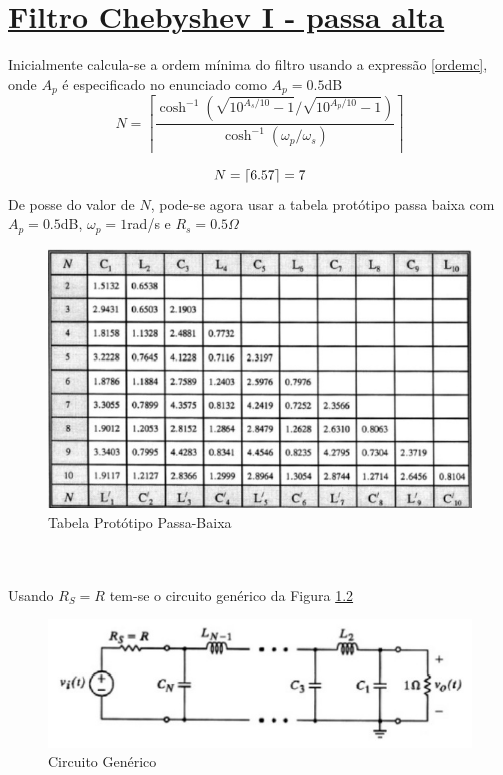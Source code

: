 \documentclass[14pt, oneside]{book}
\DeclarePairedDelimiter{\ceil}{\lceil}{\rceil}
\newcommand\tab[1][1cm]{\hspace*{#1}}
\theoremstyle{definition}
\begin{document}
             
            
        \chapter[Filtro Chebyshev I - passa alta]{\hyperlink{toc}{Filtro Chebyshev I - passa alta}}
            \tab Inicialmente calcula-se a ordem mínima do filtro usando a expressão \ref{ordemc}, onde $A_p$ é especificado no enunciado como $A_p =0.5$dB 
            \begin{equation}
            \label{ordemc}
            N = \left\lceil{\frac{\cosh^{-1}{(\sqrt{10^{A_s/10}-1}/\sqrt{10^{A_p/10}-1})}}{\cosh^{-1}{(\omega_p/\omega_s)}}}\right\rceil
            \end{equation}
            
            \begin{equation}
            \label{uhu}
            N = \ceil{6.57} = 7
            \end{equation}
            \tab De posse do valor de $N$, pode-se agora usar a tabela protótipo passa baixa com $A_p=0.5$dB, $\omega_p =1$rad/s e $R_s =0.5\Omega$\\
            \begin{figure}[H]
                \centering
                \includegraphics[scale=0.5]{tabelinha.jpeg}
                \caption{Tabela Protótipo Passa-Baixa}
                \label{a}
            \end{figure}\\~\\
            \tab Usando $R_S = R$ tem-se o circuito genérico da Figura \ref{circuitog}
            
            \begin{figure}[H]
                \centering
                \includegraphics[scale=0.5]{circuitinho.jpeg}
                \caption{Circuito Genérico}
                \label{circuitog}
            \end{figure}
             
\end{document}
